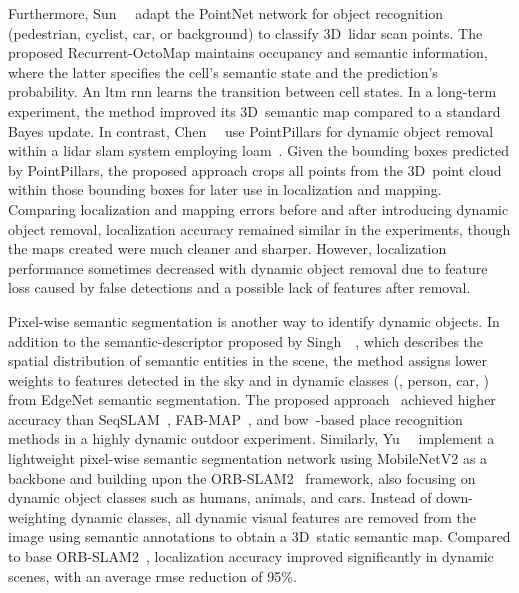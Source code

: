 Furthermore, Sun~\etal~\cite{sun:ral:2018} adapt the PointNet network
for object recognition (pedestrian, cyclist, car, or background)
to classify 3D~\gls{lidar} scan points.
The proposed Recurrent-OctoMap maintains occupancy and semantic information,
where the latter specifies the cell's semantic state
and the prediction's probability.
An \gls{ltm} \gls{rnn} learns the transition between cell states.
In a long-term experiment, the method improved its 3D~semantic map
compared to a standard Bayes update.
In contrast, Chen~\etal~\cite{chen:itsc:2022} use PointPillars for dynamic
object removal within a \gls{lidar} \gls{slam} system
employing \gls{loam}~\cite{zhang-singh:rss:2014}.
Given the bounding boxes predicted by PointPillars,
the proposed approach crops all points from the 3D~point cloud
within those bounding boxes for later use in localization and mapping.
Comparing localization and mapping errors before and after
introducing dynamic object removal, localization accuracy remained similar in
the experiments, though the maps created were much cleaner and sharper.
However, localization performance sometimes decreased with
dynamic object removal due to feature loss caused by
false detections and a possible lack of features after removal.

Pixel-wise semantic segmentation is another way to identify dynamic objects.
In addition to the semantic-descriptor proposed by
Singh~\etal~\cite{singh:itsc:2021}, which describes the spatial distribution
of semantic entities in the scene, the method assigns lower weights
to features detected in the sky and in dynamic classes (\eg, person, car, \etc)
from EdgeNet semantic segmentation.
The proposed approach~\cite{singh:itsc:2021} achieved higher accuracy
than SeqSLAM~\cite{milford-wyeth:icra:2012},
FAB-MAP~\cite{cummins-newman:ijrr:2008}, and
\gls{bow}~\cite{sivic-zisserman:iccv:2003}-based place recognition methods
in a highly dynamic outdoor experiment.
Similarly, Yu~\etal~\cite{yu:acait:2023} implement
a lightweight pixel-wise semantic segmentation network
using MobileNetV2 as a backbone and building upon
the ORB-SLAM2~\cite{mur-artal-tardos:tro:2017} framework,
also focusing on dynamic object classes such as humans, animals, and cars.
Instead of down-weighting dynamic classes, all dynamic visual features are
removed from the image using semantic annotations
to obtain a 3D~static semantic map.
Compared to base ORB-SLAM2~\cite{mur-artal-tardos:tro:2017},
localization accuracy improved significantly in dynamic scenes,
with an average \gls{rmse} reduction of 95\%.

